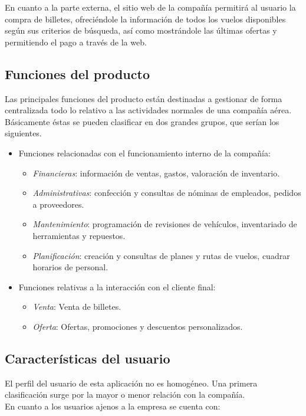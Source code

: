 \documentclass[11pt, a4paper, twoside, titlepage]{article}
\begin{document}
			En cuanto a la parte externa, el sitio web de la compañía permitirá al usuario la compra de billetes, ofreciéndole la información de todos los vuelos disponibles según sus criterios de búsqueda, así como mostrándole las últimas ofertas y permitiendo el pago a través de la web.
			
		\subsection{Funciones del producto}
			Las principales funciones del producto están destinadas a gestionar de forma centralizada todo lo relativo a las actividades normales de una compañía aérea. Básicamente éstas se pueden clasificar en dos grandes grupos, que serían los siguientes. \\
			
			\begin{itemize}
				\item Funciones relacionadas con el funcionamiento interno de la compañía:
					\begin{itemize}
						\item \textit{Financieras}: información de ventas, gastos, valoración de inventario.
						\item \textit{Administrativas}: confección y consultas de nóminas de empleados, pedidos a proveedores.
						\item \textit{Mantenimiento}: programación de revisiones de vehículos, inventariado de herramientas y repuestos.
						\item \textit{Planificación}: creación y consultas de planes y rutas de vuelos, cuadrar horarios de personal.			
					\end{itemize}
				\item Funciones relativas a la interacción con el cliente final:
					\begin{itemize}
						\item \textit{Venta}: Venta de billetes.
						\item \textit{Oferta}: Ofertas, promociones y descuentos personalizados.
					\end{itemize}
			\end{itemize}
			
		\subsection{Características del usuario}
			El perfil del usuario de esta aplicación no es homogéneo. Una primera clasificación surge por la mayor o menor relación con la compañía.\\
			En cuanto a los usuarios ajenos a la empresa se cuenta con:
	
\end{document}
